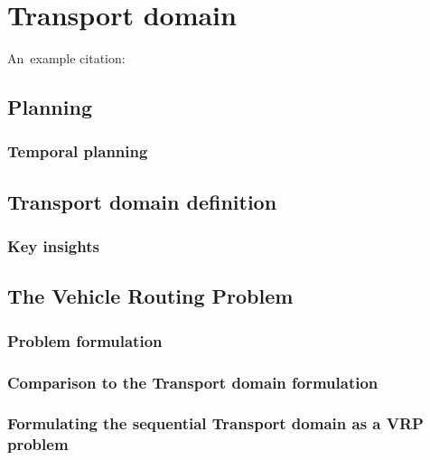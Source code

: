 \chapter{Transport domain}

An~example citation: \cite{Ghallab2004}

\section{Planning}

\subsection{Temporal planning}

\section{Transport domain definition}


\subsection{Key insights}


\section{The Vehicle Routing Problem}


\subsection{Problem formulation}

\subsection{Comparison to the Transport domain formulation}

\subsection{Formulating the sequential Transport domain as a VRP problem}

